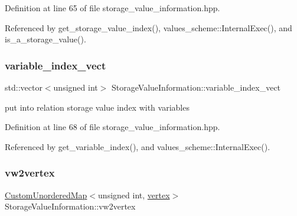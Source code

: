 Definition at line 65 of file storage\+\_\+value\+\_\+information.\+hpp.



Referenced by get\+\_\+storage\+\_\+value\+\_\+index(), values\+\_\+scheme\+::\+Internal\+Exec(), and is\+\_\+a\+\_\+storage\+\_\+value().

\mbox{\label{classStorageValueInformation_aeff413536430335a40fd77b8271396d5}} 
\subsubsection{\texorpdfstring{variable\+\_\+index\+\_\+vect}{variable\_index\_vect}}
{\footnotesize\ttfamily std\+::vector$<$unsigned int$>$ Storage\+Value\+Information\+::variable\+\_\+index\+\_\+vect\hspace{0.3cm}{\ttfamily [protected]}}



put into relation storage value index with variables 



Definition at line 68 of file storage\+\_\+value\+\_\+information.\+hpp.



Referenced by get\+\_\+variable\+\_\+index(), and values\+\_\+scheme\+::\+Internal\+Exec().

\mbox{\label{classStorageValueInformation_a07563c0af438986143be9c4103f3e6ea}} 
\subsubsection{\texorpdfstring{vw2vertex}{vw2vertex}}
{\footnotesize\ttfamily \hyperlink{custom__map_8hpp_ad1ed68f2ff093683ab1a33522b144adc}{Custom\+Unordered\+Map}$<$unsigned int, \hyperlink{graph_8hpp_abefdcf0544e601805af44eca032cca14}{vertex}$>$ Storage\+Value\+Information\+::vw2vertex\hspace{0.3cm}{\ttfamily [protected]}}



